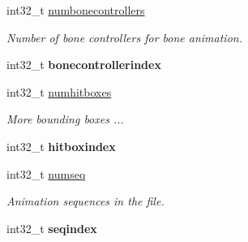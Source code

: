 \begin{DoxyCompactItemize}
\item 
\hypertarget{struct_assimp_1_1_m_d_l_1_1_header___h_l2_a4a10d7ea9055fa610c23c14debaa0a51}{int32\+\_\+t \hyperlink{struct_assimp_1_1_m_d_l_1_1_header___h_l2_a4a10d7ea9055fa610c23c14debaa0a51}{numbonecontrollers}}\label{struct_assimp_1_1_m_d_l_1_1_header___h_l2_a4a10d7ea9055fa610c23c14debaa0a51}

\begin{DoxyCompactList}\small\item\em Number of bone controllers for bone animation. \end{DoxyCompactList}\item 
\hypertarget{struct_assimp_1_1_m_d_l_1_1_header___h_l2_a317d631545e1c9fa6f43b70b17fd5f7e}{int32\+\_\+t {\bfseries bonecontrollerindex}}\label{struct_assimp_1_1_m_d_l_1_1_header___h_l2_a317d631545e1c9fa6f43b70b17fd5f7e}

\item 
\hypertarget{struct_assimp_1_1_m_d_l_1_1_header___h_l2_a4f112e5e47e5ae97c97ee26b4ead0abb}{int32\+\_\+t \hyperlink{struct_assimp_1_1_m_d_l_1_1_header___h_l2_a4f112e5e47e5ae97c97ee26b4ead0abb}{numhitboxes}}\label{struct_assimp_1_1_m_d_l_1_1_header___h_l2_a4f112e5e47e5ae97c97ee26b4ead0abb}

\begin{DoxyCompactList}\small\item\em More bounding boxes ... \end{DoxyCompactList}\item 
\hypertarget{struct_assimp_1_1_m_d_l_1_1_header___h_l2_a84bad82c4cf7c1d258142226311bd9c2}{int32\+\_\+t {\bfseries hitboxindex}}\label{struct_assimp_1_1_m_d_l_1_1_header___h_l2_a84bad82c4cf7c1d258142226311bd9c2}

\item 
\hypertarget{struct_assimp_1_1_m_d_l_1_1_header___h_l2_acc457a442ab04b5428efea7d805ff872}{int32\+\_\+t \hyperlink{struct_assimp_1_1_m_d_l_1_1_header___h_l2_acc457a442ab04b5428efea7d805ff872}{numseq}}\label{struct_assimp_1_1_m_d_l_1_1_header___h_l2_acc457a442ab04b5428efea7d805ff872}

\begin{DoxyCompactList}\small\item\em Animation sequences in the file. \end{DoxyCompactList}\item 
\hypertarget{struct_assimp_1_1_m_d_l_1_1_header___h_l2_afb9346c458cd4369d3eb89a5821a68db}{int32\+\_\+t {\bfseries seqindex}}\label{struct_assimp_1_1_m_d_l_1_1_header___h_l2_afb9346c458cd4369d3eb89a5821a68db}


\end{DoxyCompactItemize}

